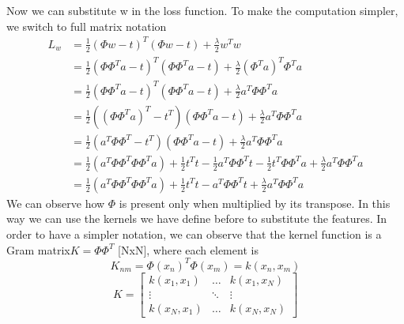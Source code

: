 \documentclass[../main.tex]{subfiles}
\begin{document}
Now we can substitute w in the loss function. To make the computation simpler, we switch to full matrix notation
\begin{align*}
    L_w & = \frac{1}{2}(\Phi w - t)^T(\Phi w - t)+\frac{\lambda}{2}w^T w                                                                                                     \\
        & = \frac{1}{2}(\Phi \Phi^T a - t)^T(\Phi \Phi^T a - t)+\frac{\lambda}{2}(\Phi^T a)^T \Phi^T a                                                                       \\
        & = \frac{1}{2}(\Phi \Phi^T a - t)^T(\Phi \Phi^T a - t)+\frac{\lambda}{2} a^T \Phi \Phi^T a                                                                          \\
        & = \frac{1}{2}((\Phi \Phi^T a)^T - t^T)(\Phi \Phi^T a - t)+\frac{\lambda}{2} a^T \Phi \Phi^T a                                                                      \\
        & = \frac{1}{2}(a^T \Phi \Phi^T - t^T)(\Phi \Phi^T a - t)+\frac{\lambda}{2} a^T \Phi \Phi^T a                                                                        \\
        & = \frac{1}{2}(a^T \Phi \Phi^T \Phi \Phi^T a) + \frac{1}{2}t^T t -\frac{1}{2} a^T \Phi \Phi^T t -\frac{1}{2} t^T \Phi \Phi^T a +\frac{\lambda}{2} a^T \Phi \Phi^T a \\
        & = \frac{1}{2}(a^T \Phi \Phi^T \Phi \Phi^T a) + \frac{1}{2}t^T t - a^T \Phi \Phi^T t +\frac{\lambda}{2} a^T \Phi \Phi^T a
\end{align*}
We can observe how $\Phi$ is present only when multiplied by its transpose. In this way we can use the kernels we have define before to substitute the features. In order to have a simpler notation, we can observe that the kernel function is a Gram matrix\footnotemark $K=\Phi\Phi^T$ [NxN], where each element is
\begin{equation*}
    K_{nm} = \Phi(x_n)^T \Phi(x_m) = k(x_n,x_m)
\end{equation*}
\begin{equation}
    K =
    \begin{bmatrix}
        k(x_1,x_1) & \dots  & k(x_1,x_N) \\
        \vdots     & \ddots & \vdots     \\
        k(x_N,x_1) & \dots  & k(x_N,x_N)
    \end{bmatrix}
\end{equation}
\end{document}
